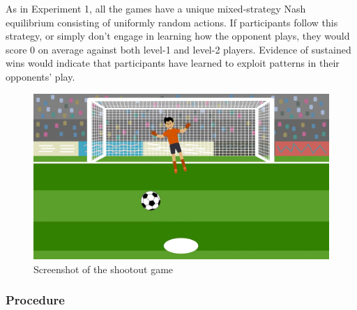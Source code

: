 \documentclass[smallextended]{svjour3}       %
\begin{document}
As in Experiment 1, all the games have a unique mixed-strategy Nash
equilibrium consisting of uniformly random actions. If participants
follow this strategy, or simply don't engage in learning how the
opponent plays, they would score 0 on average against both level-1 and
level-2 players. Evidence of sustained wins would indicate that
participants have learned to exploit patterns in their opponents' play.

\begin{figure}

{\centering \includegraphics[width=\textwidth]{../images/shootout} 

}

\caption{Screenshot of the shootout game}\label{fig:screenshot-shootout}
\end{figure}

\hypertarget{procedure-1}{%
\subsubsection{Procedure}\label{procedure-1}}
\end{document}
